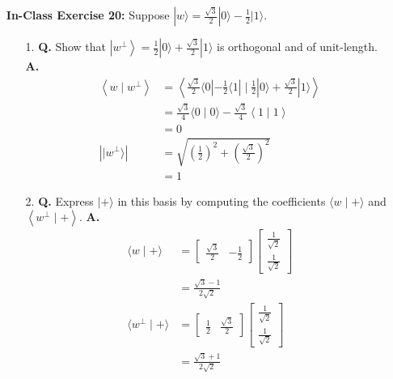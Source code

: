 \documentclass[main.tex]{subfiles}
\begin{document}
\begin{enumerate}
\begin{enumerate}
    \end{enumerate}

\item[] \textbf{In-Class Exercise 20:} Suppose $|w\rangle=\frac{\sqrt{3}}{2}|0\rangle-\frac{1}{2}|1\rangle$.

    \begin{enumerate}
    \item[1.] \textbf{Q.} Show that $\left|w^{\perp}\right\rangle=\frac{1}{2}|0\rangle+\frac{\sqrt{3}}{2}|1\rangle$ is orthogonal and of unit-length. \textbf{A.}
        \begin{align*}
            \left\langle w \mid w^{\perp}\right\rangle          & = \left\langle \frac{\sqrt{3}}{2}\langle0|-\frac{1}{2}\langle1|  \mid \frac{1}{2}|0\rangle+\frac{\sqrt{3}}{2}|1\rangle \right\rangle \\
                                                                & = \frac{\sqrt{3}}{4}\langle 0 \mid 0\rangle - \frac{\sqrt{3}}{4} \left\langle 1 \mid 1 \right\rangle \\
                                                                & = 0 \tag{orthogonal} \\
             \left| |w^{\perp}\rangle \right|             & = \sqrt{\left(\frac{1}{2}\right)^2+\left(\frac{\sqrt{3}}{2}\right)^2}\\
                                                                & = 1 \tag{unit length}
        \end{align*}
    \item[2.] \textbf{Q.} Express $|+\rangle$ in this basis by computing the coefficients $\langle w \mid+\rangle$ and $\left\langle w^{\perp} \mid+\right\rangle$. \textbf{A.}
        \begin{align*}
            \langle w \mid+\rangle          & = \left[\begin{array}{ll} \frac{\sqrt{3}}{2} & -\frac{1}{2} \end{array}\right] \left[\begin{array}{c} \frac{1}{\sqrt{2}} \\ \frac{1}{\sqrt{2}} \end{array}\right]\\
                                            & = \frac{\sqrt{3}-1}{2\sqrt{2}} \\
            \langle w^{\perp} \mid+\rangle  & = \left[\begin{array}{ll} \frac{1}{2} & \frac{\sqrt{3}}{2} \end{array}\right] \left[\begin{array}{c} \frac{1}{\sqrt{2}} \\ \frac{1}{\sqrt{2}} \end{array}\right]\\
                                            & = \frac{\sqrt{3}+1}{2\sqrt{2}} \\
        \end{align*}
        

\end{enumerate}
\end{enumerate}
\end{document}
